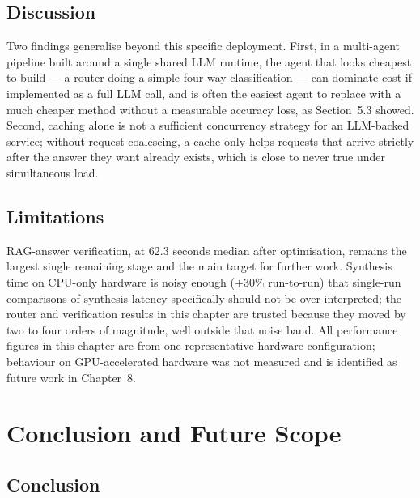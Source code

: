 \documentclass[11pt,a4paper,oneside]{report}
\begin{document}
\section{Discussion}

Two findings generalise beyond this specific deployment. First, in a
multi-agent pipeline built around a single shared LLM runtime, the agent that
looks cheapest to build --- a router doing a simple four-way classification
--- can dominate cost if implemented as a full LLM call, and is often the
easiest agent to replace with a much cheaper method without a measurable
accuracy loss, as Section~5.3 showed. Second, caching alone is not a
sufficient concurrency strategy for an LLM-backed service; without request
coalescing, a cache only helps requests that arrive strictly after the
answer they want already exists, which is close to never true under
simultaneous load.

\section{Limitations}

RAG-answer verification, at 62.3 seconds median after optimisation, remains
the largest single remaining stage and the main target for further work.
Synthesis time on CPU-only hardware is noisy enough ($\pm$30\% run-to-run)
that single-run comparisons of synthesis latency specifically should not be
over-interpreted; the router and verification results in this chapter are
trusted because they moved by two to four orders of magnitude, well outside
that noise band. All performance figures in this chapter are from one
representative hardware configuration; behaviour on GPU-accelerated hardware
was not measured and is identified as future work in Chapter~8.

\chapter{Conclusion and Future Scope}

\section{Conclusion}
\end{document}
